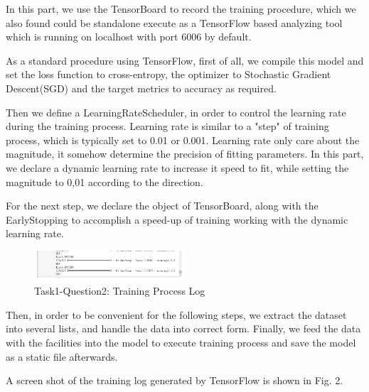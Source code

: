 \documentclass[conference]{IEEEtran}
\begin{document}
In this part, we use the TensorBoard to record the training procedure, which we also found could be standalone execute as a TensorFlow based analyzing tool which is running on localhost with port 6006 by default.\par 
As a standard procedure using TensorFlow, first of all, we compile this model and set the loss function to cross-entropy, the optimizer to Stochastic Gradient Descent(SGD) and the target metrics to accuracy as required. \par
Then we define a LearningRateScheduler, in order to control the learning rate during the training process. Learning rate is similar to a "step" of training process, which is typically set to 0.01 or 0.001. Learning rate only care about the magnitude, it somehow determine the precision of fitting parameters. In this part, we declare a dynamic learning rate to increase it speed to fit, while setting the magnitude to 0,01 according to the direction.\par
For the next step, we declare the object of TensorBoard, along with the EarlyStopping to accomplish a speed-up of training working with the dynamic learning rate.
\begin{figure}[h] 
    \centering
    \includegraphics[width=0.5\textwidth]{T1Q2.png}
    \caption{Task1-Question2: Training Process Log} 
    \label{Fig.t1q2} 
\end{figure}
Then, in order to be convenient for the following steps, we extract the dataset into several lists, and handle the data into correct form. Finally, we feed the data with the facilities into the model to execute training process and save the model as a static file afterwards.\par
A screen shot of the training log generated by TensorFlow is shown in Fig. 2.
\end{document}
